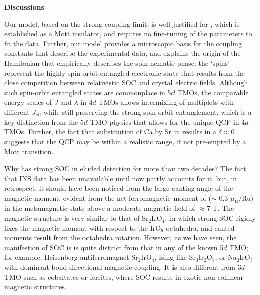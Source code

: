 \vspace{ 10 pt}
\noindent
{\bf Discussions}

\noindent
Our model, based on the strong-coupling limit, is well justified for \CROns, which is established as a Mott insulator, and requires no fine-tuning of the parameters to fit the data. Further, our model provides a microscopic basis for the coupling constants that describe the experimental data, and explains the origin of the Hamilonian that empirically describes the spin-nematic phase: the `spins' represent the highly spin-orbit entangled electronic state that results from the close competition between relativistic SOC and crystal electric fields. Although such spin-orbit entangled states are commonplace in 5$d$ TMOs, the comparable energy scales of $J$ and $\lambda$ in 4$d$ TMOs allows intermixing of multiplets with different $J_{\mathrm {eff}}$ while still preserving the strong spin-orbit entanglement, which is a key distinction from the 5$d$ TMO physics that allows for the unique QCP in 4$d$ TMOs. Further, the fact that substitution of Ca by Sr in \CRO results in a $\delta$$\approx$0 suggests that the QCP may be within a realistic range, if not pre-empted by a Mott transition.

Why has strong SOC in \CRO eluded detection for more than two decades? The fact that INS data has been unavailable until now partly accounts for it, but, in retrospect, it should have been noticed from the large canting angle of the magnetic moment, evident from the net ferromagnetic moment of ($\sim$ 0.3 $\mu_{\mathrm{B}}$/Ru) in the metamagnetic state above a moderate magnetic field of $\approx7$ T. The magnetic structure is very similar to that of Sr$_2$IrO$_4$, in which strong SOC rigidly fixes the magnetic moment with respect to the IrO$_6$ octahedra, and canted moments result from the octahedra rotation. However, as we have seen, the manifestion of SOC is \CRO is quite distinct from that in any of the known 5$d$ TMO; for example, Heisenberg antiferromagnet Sr$_2$IrO$_4$,  Ising-like Sr$_3$Ir$_2$O$_7$, or Na$_2$IrO$_3$ with dominant bond-directional magnetic coupling. It is also different from 3$d$ TMO such as cobaltates or ferrites, where SOC results in exotic non-collinear magnetic structures.
  